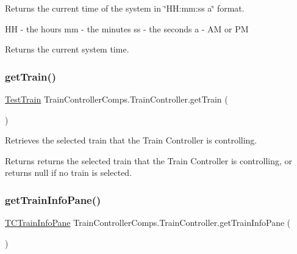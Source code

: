 Returns the current time of the system in \char`\"{}\+H\+H\+:mm\+:ss a\char`\"{} format. 

HH -\/ the hours mm -\/ the minutes ss -\/ the seconds a -\/ AM or PM

\begin{DoxyReturn}{Returns}
the current system time. 
\end{DoxyReturn}
\mbox{\label{classTrainControllerComps_1_1TrainController_aaa1cf5d5d3cae08191c34c680943f5f0}} 
\subsubsection{\texorpdfstring{get\+Train()}{getTrain()}}
{\footnotesize\ttfamily \hyperlink{classTrainControllerComps_1_1TestTrain}{Test\+Train} Train\+Controller\+Comps.\+Train\+Controller.\+get\+Train (\begin{DoxyParamCaption}{ }\end{DoxyParamCaption})}



Retrieves the selected train that the Train Controller is controlling. 

\begin{DoxyReturn}{Returns}
returns the selected train that the Train Controller is controlling, or returns null if no train is selected. 
\end{DoxyReturn}
\mbox{\label{classTrainControllerComps_1_1TrainController_ade09a96255871c37628faf44250981fe}} 
\subsubsection{\texorpdfstring{get\+Train\+Info\+Pane()}{getTrainInfoPane()}}
{\footnotesize\ttfamily \hyperlink{classTrainControllerComps_1_1TCTrainInfoPane}{T\+C\+Train\+Info\+Pane} Train\+Controller\+Comps.\+Train\+Controller.\+get\+Train\+Info\+Pane (\begin{DoxyParamCaption}{ }\end{DoxyParamCaption})}



